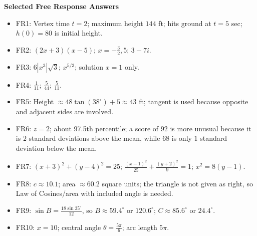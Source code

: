 \documentclass[11pt]{article}
\begin{document}
\textbf{Selected Free Response Answers}
\begin{itemize}
\item FR1: Vertex time $t=2$; maximum height $144$ ft; hits ground at $t=5$ sec; $h(0)=80$ is initial height.
\item FR2: $(2x+3)(x-5)$; $x=-\frac{3}{2},5$; $3-7i$.
\item FR3: $6|x^3|\sqrt{3}$; $x^{5/3}$; solution $x=1$ only.
\item FR4: $\frac{1}{11}$; $\frac{5}{44}$; $\frac{5}{11}$.
\item FR5: Height $\approx 48\tan(38^\circ)+5\approx 43$ ft; tangent is used because opposite and adjacent sides are involved.
\item FR6: $z=2$; about 97.5th percentile; a score of $92$ is more unusual because it is $2$ standard deviations above the mean, while $68$ is only $1$ standard deviation below the mean.
\item FR7: $(x+3)^2+(y-4)^2=25$; $\frac{(x-1)^2}{25}+\frac{(y+2)^2}{9}=1$; $x^2=8(y-1)$.
\item FR8: $c\approx10.1$; area $\approx60.2$ square units; the triangle is not given as right, so Law of Cosines/area with included angle is needed.
\item FR9: $\sin B=\frac{18\sin35^\circ}{12}$, so $B\approx59.4^\circ$ or $120.6^\circ$; $C\approx85.6^\circ$ or $24.4^\circ$.
\item FR10: $x=10$; central angle $\theta=\frac{5\pi}{6}$; arc length $5\pi$.
\end{itemize}
\end{document}
